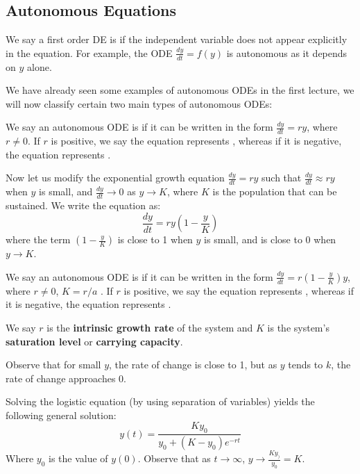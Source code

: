\subsection{Autonomous Equations}

\begin{defbox}
    We say a first order DE is  if the independent variable does not appear explicitly in the equation. For example, the ODE $\frac{dy}{dt} = f(y)$ is autonomous as it depends on $y$ alone.
\end{defbox}

We have already seen some examples of autonomous ODEs in the first lecture, we will now classify certain two main types of autonomous ODEs:

\begin{defbox}
    We say an autonomous ODE is  if it can be written in the form $\frac{dy}{dt} = ry$, where $r \neq 0$. If $r$ is positive, we say the equation represents , whereas if it is negative, the equation represents .
\end{defbox}

Now let us modify the exponential growth equation $\frac{dy}{dt} = ry$ such that $\frac{dy}{dt} \approx ry$ when $y$ is small, and $\frac{dy}{dt} \to 0$ as $y \to K$, where $K$ is the population that can be sustained. We write the equation as:
\[\frac{dy}{dt} = ry\left(1 - \frac{y}{K}\right)\]
where the term $\left(1 - \frac{y}{K}\right)$ is close to 1 when $y$ is small, and is close to 0 when $y \to K$. 

\begin{defbox}
    We say an autonomous ODE is  if it can be written in the form $\frac{dy}{dt} = r\left(1 - \frac{y}{K}\right)y$, where $r \neq 0$, $K = r/a$ . If $r$ is positive, we say the equation represents , whereas if it is negative, the equation represents .
\end{defbox}

We say $r$ is the \textbf{intrinsic growth rate} of the system and $K$ is the system's \textbf{saturation level} or \textbf{carrying capacity}.

Observe that for small $y$, the rate of change is close to 1, but as $y$ tends to $k$, the rate of change approaches 0.

\begin{remark} 
   Solving the logistic equation (by using separation of variables) yields the following general solution:
   \[ y(t) = \frac{Ky_0}{y_0 + (K - y_0)e^{-rt}} \]
      Where $y_0$ is the value of $y(0)$. Observe that as $t \to \infty$, $y \to \frac{Ky_)}{y_0} = K$. 
\end{remark}
